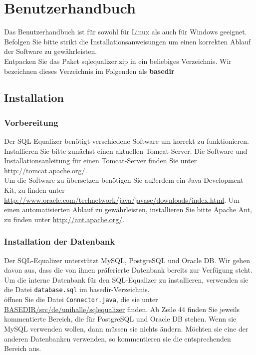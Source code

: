 \section{Benutzerhandbuch} 

Das Benutzerhandbuch ist für sowohl für Linux als auch für Windows geeignet. Befolgen Sie bitte strikt die Installationsanweisungen um einen korrekten Ablauf der Software zu gewährleisten.\\

Entpacken Sie das Paket sqlequalizer.zip in ein beliebiges Verzeichnis. Wir bezeichnen dieses Verzeichnis im Folgenden als \textbf{basedir}\\

\subsection{Installation}

\subsubsection{Vorbereitung}

Der SQL-Equalizer benötigt verschiedene Software um korrekt zu funktionieren. Installieren Sie bitte zunächst einen aktuellen Tomcat-Server. Die Software und Installationsanleitung für einen Tomcat-Server finden Sie unter \url{http://tomcat.apache.org/}.\\

Um die Software zu übersetzen benötigen Sie außerdem ein Java Development Kit, zu finden unter \url{http://www.oracle.com/technetwork/java/javase/downloads/index.html}. Um einen automatisierten Ablauf zu gewährleisten, installieren Sie bitte Apache Ant, zu finden unter \url{http://ant.apache.org/}.\\

\subsubsection{Installation der Datenbank}

Der SQL-Equalizer unterstützt MySQL, PostgreSQL und Oracle DB. Wir gehen davon aus, dass die von ihnen präferierte Datenbank bereits zur Verfügung steht.\\

Um die interne Datenbank für den SQL-Equalizer zu installieren, verwenden sie die Datei \verb|database.sql| im basedir-Verzeichnis.\\

öffnen Sie die Datei \verb|Connector.java|, die sie unter \url{BASEDIR/src/de/unihalle/sqlequalizer} finden. Ab Zeile 44 finden Sie jeweils kommentierte Bereich, die für PostgreSQL und Oracle DB stehen. Wenn sie MySQL verwenden wollen, dann müssen sie nichts ändern. Möchten sie eine der anderen Datenbanken verwenden, so kommentieren sie die entsprechenden Bereich aus.\\

